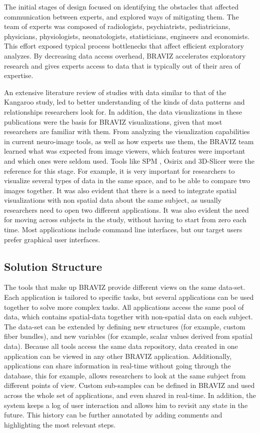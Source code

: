 \documentclass[utf8,paper]{frontiersSCNS} %
\begin{document}
The initial stages of design focused on identifying the obstacles that affected communication between experts, and explored ways of mitigating them. The team of experts was composed of radiologists, psychiatrists, pediatricians, physicians, physiologists, neonatologists,  statisticians, engineers and economists. This effort exposed typical process bottlenecks that affect efficient exploratory analyzes. By decreasing data access overhead, BRAVIZ accelerates exploratory research and gives experts access to data that is typically out of their area of expertise.

An extensive literature review of studies with data similar to that of the Kangaroo study, led to better understanding of the kinds of data patterns and relationships researchers look for. In addition, the data visualizations in these publications were the basis for BRAVIZ visualizations, given that most researchers are familiar with them. From analyzing the visualization capabilities in current neuro-image tools, as well as how experts use them, the BRAVIZ team learned what was expected from image viewers, which features were important and which ones were seldom used. Tools like SPM \citep{friston_statistical_2007}, Osirix \citep{rosset_osirix:_2004} and 3D-Slicer \citep{fedorov_3d_2012} were the reference for this stage. For example, it is very important for researchers to visualize several types of data in the same space, and to be able to compare two images together. It was also evident that there is a need to integrate spatial visualizations with non spatial data about the same subject, as usually researchers need to open two different applications. It was also evident the need for moving across subjects in the study, without having to start from zero each time. Most applications include command line interfaces, but our target users prefer graphical user interfaces. 

\subsection{Solution Structure}

The tools that make up BRAVIZ provide different views on the same data-set. Each application is tailored to specific tasks, but several applications can be used together to solve more complex tasks. All applications access the same pool of data, which contains spatial-data together with non-spatial data on each subject. The data-set can be extended by defining new structures (for example, custom fiber bundles), and new variables (for example, scalar values derived from spatial data). Because all tools access the same data repository, data created in one application can be viewed in any other BRAVIZ application. Additionally, applications can share information in real-time without going through the database, this for example, allows researchers to look at the same subject from different points of view. Custom sub-samples can be defined in BRAVIZ and used across the whole set of applications, and even shared in real-time. In addition, the system keeps a log of user interaction and allows him to revisit any state in the future. This history can be further annotated by adding comments and highlighting the most relevant steps.
\end{document}
